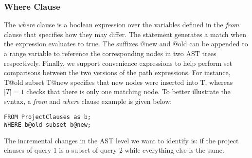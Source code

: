\subsubsection{Where Clause}
The \emph{where} clause is a boolean expression over the variables defined in the \emph{from} clause that specifies how they may differ. The statement generates a match when the expression evaluates to true. The suffixes @new and @old can be appended to a range variable to reference the corresponding nodes in two AST trees respectively. Finally, we support convenience expressions to help perform set comparisons between the two versions of the path expressions. For instance, T@old subset T@new specifies that new nodes were inserted into T, whereas $|T| = 1$ checks that there is only one matching node. To better illustrate the syntax, a \emph{from} and \emph{where} clause example is given below:
\begin{verbatim}
FROM ProjectClauses as b;
WHERE b@old subset b@new;
\end{verbatim}
The incremental changes in the AST level we want to identify is: if the project clauses of query 1 is a subset of query 2 while everything else is the same.
